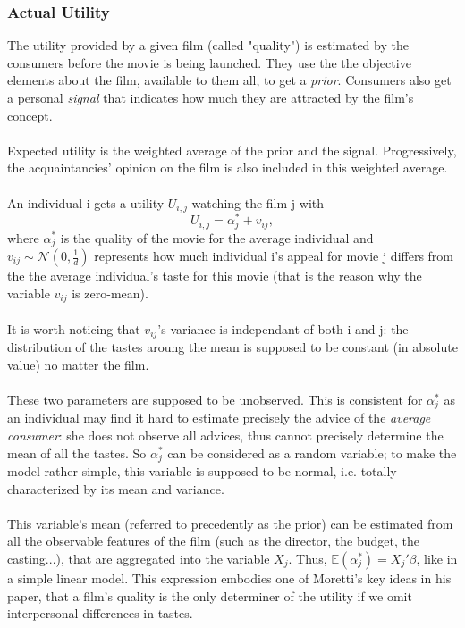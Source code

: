 	\subsubsection{Actual Utility}
	The utility provided by a given film (called "quality") is estimated by the consumers before the movie is being launched. They use the the objective elements about the film, available to them all, to get a \textit{prior}. Consumers also get a personal \textit{signal} that indicates how much they are attracted by the film's concept.\\
	\\
	Expected utility is the weighted average of the prior and the signal. Progressively, the acquaintancies' opinion on the film is also included in this weighted average. \\
	\\
	An individual i gets a utility $U_{i,j}$ watching the film j with\\
	\begin{equation} \label{eq:1}
		U_{i,j}=\alpha_{j}^{*}+v_{i j},
	\end{equation}
	where $\alpha_{j}^{*}$ is the quality of the movie for the average individual and $v_{i j}\sim \mathcal{N}(0,\frac{1}{d})$ represents how much individual i's appeal for movie j differs from the the average individual's taste for this movie (that is the reason why the variable $v_{i j}$ is zero-mean).\\
	\\
	It is worth noticing that $v_{i j}$'s variance is independant of both i and j: the distribution of the tastes aroung the mean is supposed to be constant (in absolute value) no matter the film.\\
	\\
	These two parameters are supposed to be unobserved. This is consistent for $\alpha_{j}^{*}$ as an individual may find it hard to estimate precisely the advice of the \textit{average consumer}: she does not observe all advices, thus cannot precisely determine the mean of all the tastes. So $\alpha_{j}^{*}$ can be considered as a random variable; to make the model rather simple, this variable is supposed to be normal, i.e. totally characterized by its mean and variance.\\
	\\
	This variable's mean (referred to precedently as the prior) can be estimated from all the observable features of the film (such as the director, the budget, the casting...), that are aggregated into the variable $X_{j}$. Thus, $\mathbb{E}(\alpha_{j}^{*})=X_{j}'\beta$, like in a simple linear model. This expression embodies one of Moretti's key ideas in his paper, that a film's quality is the only determiner of the utility if we omit interpersonal differences in tastes.\\
